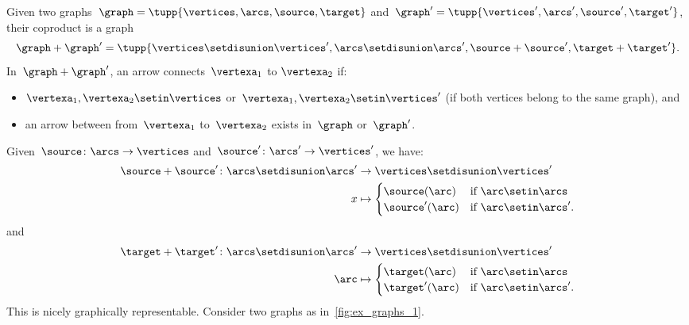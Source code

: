 \begin{example}
    \label{def:ex_graph}
    Given two graphs~$\graph=\tupp{\vertices,\arcs,\source,\target}$ and~$\graph'=\tupp{\vertices',\arcs',\source',\target'}$, their coproduct is a graph
    \begin{equation*}
        \graph+\graph'=\tupp{\vertices \setdisunion\vertices',\arcs \setdisunion\arcs',\source+\source',\target+\target'}.
    \end{equation*}
    In~$\graph+\graph'$, an arrow connects~$\vertexa_1$ to $\vertexa_2$ if:
    \begin{itemize}
        \item $\vertexa_1,\vertexa_2\setin \vertices$ or~$\vertexa_1,\vertexa_2\setin \vertices'$ (if both vertices belong to the same graph), and
        \item an arrow between from~$\vertexa_1$ to~$\vertexa_2$ exists in~$\graph$ or~$\graph'$.
    \end{itemize}
    Given~$\source \colon \arcs \to \vertices$ and~$\source'\colon \arcs'\to \vertices'$, we have:
    \begin{equation*}
        \begin{aligned}
            \source +\source'\colon \arcs\setdisunion \arcs' & \to \vertices \setdisunion \vertices' \\
            x                                                & \mapsto
            \begin{cases}
                \source(\arc)  & \text{if } \arc\setin \arcs   \\
                \source'(\arc) & \text{if } \arc\setin \arcs'.
            \end{cases}
        \end{aligned}
    \end{equation*}
    and
    \begin{equation*}
        \begin{aligned}
            \target +\target '\colon \arcs\setdisunion \arcs ' & \to \vertices\setdisunion \vertices' \\
            \arc                                               & \mapsto
            \begin{cases}
                \target(\arc)  & \text{if } \arc\setin \arcs   \\
                \target'(\arc) & \text{if } \arc\setin \arcs'.
            \end{cases}
        \end{aligned}
    \end{equation*}
    This is nicely graphically representable.
    Consider two graphs as in~\cref{fig:ex_graphs_1}.


\end{example}
